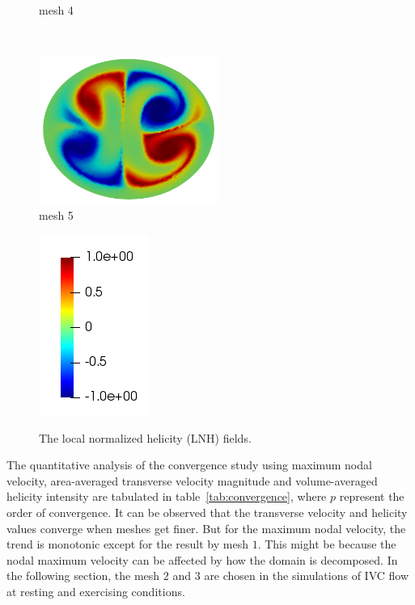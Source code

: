 \begin{figure}[htbp]
\begin{minipage}[c][2in][c]{0.4\linewidth}
        mesh 4
    \end{minipage}\\[.5\baselineskip]
    \begin{minipage}[c][2in][c]{0.4\linewidth}
        \centering
        \includegraphics[width=2.3in]{imgs/vena_cava/LNH_mesh5.png}\\
        mesh 5
    \end{minipage}
    \begin{minipage}[c][2in][c]{0.4\linewidth}
        \centering
        \includegraphics[width=.7in]{imgs/vena_cava/colormap_LNH.png}\\
    \end{minipage}
    \caption{The local normalized helicity (LNH) fields.}
    \label{fig:lnh}
\end{figure}

The quantitative analysis of the convergence study using maximum nodal velocity, area-averaged transverse velocity magnitude and volume-averaged helicity intensity are tabulated in table~\ref{tab:convergence}, where $p$ represent the order of convergence.
It can be observed that the transverse velocity and helicity values converge when meshes get finer. But for the maximum nodal velocity, the trend is monotonic except for the result by mesh $1$. This might be because the nodal maximum velocity can be affected by how the domain is decomposed. In the following section, the mesh $2$ and $3$ are chosen in the simulations of IVC flow at resting and exercising conditions.

